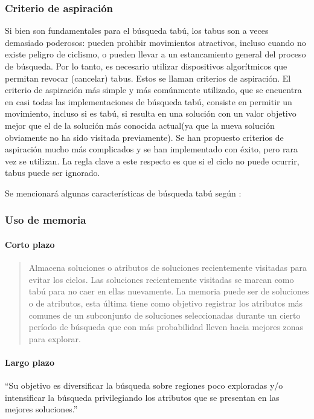 \subsubsection{Criterio de aspiración}
Si bien son fundamentales para el búsqueda tabú, los tabus son a veces demasiado poderosos: pueden prohibir movimientos atractivos, incluso cuando no existe peligro de ciclismo, o pueden llevar a un estancamiento general del proceso de búsqueda. Por lo tanto, es necesario utilizar dispositivos algorítmicos que permitan revocar (cancelar) tabus. Estos se llaman criterios de aspiración. El criterio de aspiración más simple y más comúnmente utilizado, que se encuentra en casi todas las implementaciones de búsqueda tabú, consiste en permitir un movimiento, incluso si es tabú, si resulta en una solución con un valor objetivo mejor que el de la solución más conocida actual(ya que la nueva solución obviamente no ha sido visitada previamente). Se han propuesto criterios de aspiración mucho más complicados y se han implementado con éxito, pero rara vez se utilizan. La regla clave a este respecto es que si el ciclo no puede ocurrir, tabus puede ser ignorado. \cite{2010HandbookMetaheuristics}

Se mencionará algunas características de búsqueda tabú según \cite{RiojasCanari2005BusquedaN-reinas}:
\subsubsection{Uso de memoria}
\paragraph{Corto plazo}
\begin{quote}Almacena soluciones o atributos de soluciones recientemente visitadas para evitar los ciclos. Las soluciones recientemente visitadas se marcan como tabú para no caer en ellas nuevamente. La memoria puede ser de soluciones o de atributos, esta última tiene como objetivo registrar los atributos más comunes de un subconjunto de soluciones seleccionadas durante un cierto período de búsqueda que con más probabilidad lleven hacia mejores zonas para explorar. \cite{RiojasCanari2005BusquedaN-reinas}\end{quote}
\paragraph{Largo plazo}
“Su objetivo es diversificar la búsqueda sobre regiones poco exploradas y/o intensificar la búsqueda privilegiando los atributos que se presentan en las mejores soluciones.” \cite{RiojasCanari2005BusquedaN-reinas}
